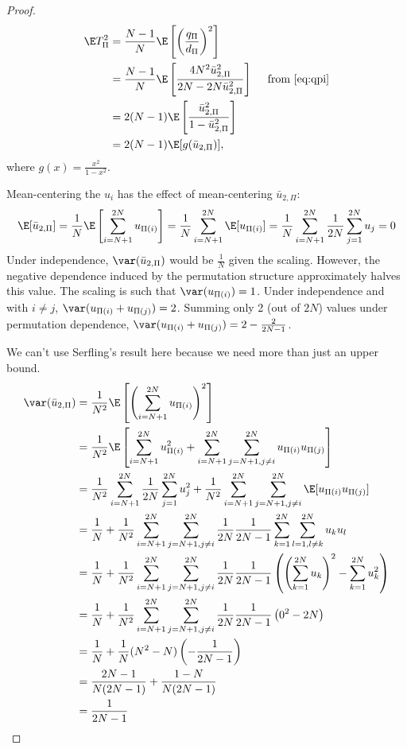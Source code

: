 \begin{proof}
  \begin{align}
    \E T_{\Pi}^2
    &= \frac{N-1}{N} \E \left [ \left ( \frac{q_\Pi}{d_\Pi} \right )^2 \right ] \\
    &= \frac{N-1}{N} \E \left [\frac{
        4 N^2\bar{u}_{2,\Pi}^2}{2N-2N\bar{u}_{2,\Pi}^2} \right ] \quad \text{ from } \eqref{eq:qpi}
    \nonumber \\
    &= 2(N-1)\E \left [\frac{
        \bar{u}_{2,\Pi}^2}{1-\bar{u}_{2,\Pi}^2} \right ] \nonumber \\
    &= 2(N-1) \E[g(\bar{u}_{2,\Pi})], \label{def:varT}
  \end{align}
  where $g(x) = \frac{x^2}{1-x^2}$. 

  Mean-centering the $u_{i}$ has the effect of mean-centering $\bar{u}_{2,\Pi}$:
  \begin{equation*}
    \E[\bar{u}_{2,\Pi}] = 
    \frac{1}{N} \E \left [ \sum_{i=N+1}^{2N} u_{\Pi(i)} \right ] = 
    \frac{1}{N} \sum_{i=N+1}^{2N} \E[u_{\Pi(i)}] = 
    \frac{1}{N} \sum_{i=N+1}^{2N} \frac{1}{2N} \sum_{j=1}^{2N} u_{j} = 0
  \end{equation*}
  Under independence, $\var(\bar{u}_{2,\Pi})$ would be $\frac{1}{N}$ given
  the scaling.  However, the negative dependence induced by the
  permutation structure approximately halves this value.
  The scaling is such that $\var(u_{\Pi(i)}) = 1$.  Under independence and
  with $i \neq j$, $\var(u_{\Pi(i)} + u_{\Pi(j)}) = 2$.  Summing only 2 (out of $2N$)
  values under permutation dependence, $\var(u_{\Pi(i)} + u_{\Pi(j)}) = 2 - \frac{2}{2N-1}$.

  We can't use Serfling's result here because we need more than just an upper bound.
  \begin{align*}
    \var(\bar{u}_{2,\Pi}) 
    &= \frac{1}{N^2} \E \left [\left (\sum_{i=N+1}^{2N}u_{\Pi(i)}\right )^2\right ] \\
    &= \frac{1}{N^2} \E \left [\sum_{i=N+1}^{2N} u_{\Pi(i)}^2 +
    \sum_{i=N+1}^{2N}\sum_{j=N+1, j\neq i}^{2N}u_{\Pi(i)}u_{\Pi(j)} \right ] \\
    &= \frac{1}{N^2} \sum_{i=N+1}^{2N} \frac{1}{2N} \sum_{j=1}^{2N} u_{j}^2
    + \frac{1}{N^2}\sum_{i=N+1}^{2N}\sum_{j=N+1, j\neq
      i}^{2N} \E[u_{\Pi(i)} u_{\Pi(j)}] \\
    &= \frac{1}{N} + \frac{1}{N^2}\sum_{i=N+1}^{2N}\sum_{j=N+1, j\neq
      i}^{2N} \frac{1}{2N}\frac{1}{2N-1}\sum_{k=1}^{2N}
    \sum_{l=1, l\neq k}^{2N} u_ku_l \\
    &= \frac{1}{N} + \frac{1}{N^2}\sum_{i=N+1}^{2N}\sum_{j=N+1, j\neq
      i}^{2N} \frac{1}{2N}\frac{1}{2N-1} \left (
    \left (\sum_{k=1}^{2N} u_k \right )^2 - \sum_{k=1}^{2N} u_k^2
  \right ) \\
    &= \frac{1}{N} + \frac{1}{N^2}\sum_{i=N+1}^{2N}\sum_{j=N+1, j\neq
      i}^{2N} \frac{1}{2N}\frac{1}{2N-1} \left (
    0^2 - 2N \right ) \\
    &= \frac{1}{N} + \frac{1}{N}(N^2-N)\left (-\frac{1}{2N-1}\right ) \\
    &= \frac{2N-1}{N(2N-1)} + \frac{1-N}{N(2N-1)} \\
    &= \frac{1}{2N-1}
  \end{align*}


\end{proof}
